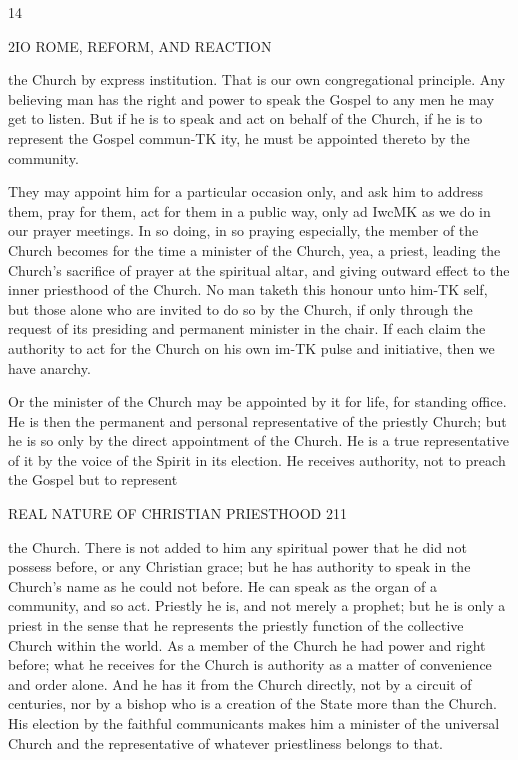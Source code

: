 \documentclass[12pt,a5paper,twoside]{book}
\begin{document}
{{14 



2IO ROME, REFORM, AND REACTION 

the Church by express institution. That is our own 
congregational principle. Any believing man has the 
right and power to speak the Gospel to any men he may 
get to listen. But if he is to speak and act on behalf 
of the Church, if he is to represent the Gospel commun-TK
ity, he must be appointed thereto by the community. 

They may appoint him for a particular occasion 
only, and ask him to address them, pray for them, act 
for them in a public way, only ad IwcMK as we do in 
our prayer meetings. In so doing, in so praying 
especially, the member of the Church becomes for the 
time a minister of the Church, yea, a priest, leading 
the Church's sacrifice of prayer at the spiritual altar, 
and giving outward effect to the inner priesthood of 
the Church. No man taketh this honour unto him-TK
self, but those alone who are invited to do so by the 
Church, if only through the request of its presiding 
and permanent minister in the chair. If each claim 
the authority to act for the Church on his own im-TK
pulse and initiative, then we have anarchy. 

Or the minister of the Church may be appointed 
by it for life, for standing office. He is then the 
permanent and personal representative of the priestly 
Church; but he is so only by the direct appointment 
of the Church. He is a true representative of it by 
the voice of the Spirit in its election. He receives 
authority, not to preach the Gospel but to represent 



REAL NATURE OF CHRISTIAN PRIESTHOOD 211 

the Church. There is not added to him any spiritual 
power that he did not possess before, or any Christian 
grace; but he has authority to speak in the Church's 
name as he could not before. He can speak as the 
organ of a community, and so act. Priestly he is, and 
not merely a prophet; but he is only a priest in the 
sense that he represents the priestly function of the 
collective Church within the world. As a member 
of the Church he had power and right before; what 
he receives for the Church is authority as a matter of 
convenience and order alone. And he has it from the 
Church directly, not by a circuit of centuries, nor by 
a bishop who is a creation of the State more than the 
Church. His election by the faithful communicants 
makes him a minister of the universal Church and 
the representative of whatever priestliness belongs to 
that. 

}}
\end{document}
